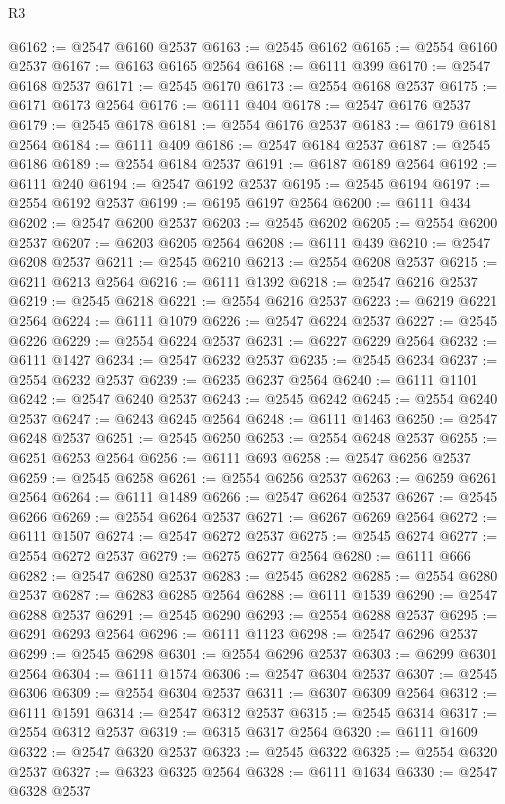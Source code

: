 \begin{lexlean}{R3}
\begin{coremodule}
@6162 := @2547 @6160 @2537
@6163 := @2545 @6162
@6165 := @2554 @6160 @2537
@6167 := @6163 @6165 @2564
@6168 := @6111 @399
@6170 := @2547 @6168 @2537
@6171 := @2545 @6170
@6173 := @2554 @6168 @2537
@6175 := @6171 @6173 @2564
@6176 := @6111 @404
@6178 := @2547 @6176 @2537
@6179 := @2545 @6178
@6181 := @2554 @6176 @2537
@6183 := @6179 @6181 @2564
@6184 := @6111 @409
@6186 := @2547 @6184 @2537
@6187 := @2545 @6186
@6189 := @2554 @6184 @2537
@6191 := @6187 @6189 @2564
@6192 := @6111 @240
@6194 := @2547 @6192 @2537
@6195 := @2545 @6194
@6197 := @2554 @6192 @2537
@6199 := @6195 @6197 @2564
@6200 := @6111 @434
@6202 := @2547 @6200 @2537
@6203 := @2545 @6202
@6205 := @2554 @6200 @2537
@6207 := @6203 @6205 @2564
@6208 := @6111 @439
@6210 := @2547 @6208 @2537
@6211 := @2545 @6210
@6213 := @2554 @6208 @2537
@6215 := @6211 @6213 @2564
@6216 := @6111 @1392
@6218 := @2547 @6216 @2537
@6219 := @2545 @6218
@6221 := @2554 @6216 @2537
@6223 := @6219 @6221 @2564
@6224 := @6111 @1079
@6226 := @2547 @6224 @2537
@6227 := @2545 @6226
@6229 := @2554 @6224 @2537
@6231 := @6227 @6229 @2564
@6232 := @6111 @1427
@6234 := @2547 @6232 @2537
@6235 := @2545 @6234
@6237 := @2554 @6232 @2537
@6239 := @6235 @6237 @2564
@6240 := @6111 @1101
@6242 := @2547 @6240 @2537
@6243 := @2545 @6242
@6245 := @2554 @6240 @2537
@6247 := @6243 @6245 @2564
@6248 := @6111 @1463
@6250 := @2547 @6248 @2537
@6251 := @2545 @6250
@6253 := @2554 @6248 @2537
@6255 := @6251 @6253 @2564
@6256 := @6111 @693
@6258 := @2547 @6256 @2537
@6259 := @2545 @6258
@6261 := @2554 @6256 @2537
@6263 := @6259 @6261 @2564
@6264 := @6111 @1489
@6266 := @2547 @6264 @2537
@6267 := @2545 @6266
@6269 := @2554 @6264 @2537
@6271 := @6267 @6269 @2564
@6272 := @6111 @1507
@6274 := @2547 @6272 @2537
@6275 := @2545 @6274
@6277 := @2554 @6272 @2537
@6279 := @6275 @6277 @2564
@6280 := @6111 @666
@6282 := @2547 @6280 @2537
@6283 := @2545 @6282
@6285 := @2554 @6280 @2537
@6287 := @6283 @6285 @2564
@6288 := @6111 @1539
@6290 := @2547 @6288 @2537
@6291 := @2545 @6290
@6293 := @2554 @6288 @2537
@6295 := @6291 @6293 @2564
@6296 := @6111 @1123
@6298 := @2547 @6296 @2537
@6299 := @2545 @6298
@6301 := @2554 @6296 @2537
@6303 := @6299 @6301 @2564
@6304 := @6111 @1574
@6306 := @2547 @6304 @2537
@6307 := @2545 @6306
@6309 := @2554 @6304 @2537
@6311 := @6307 @6309 @2564
@6312 := @6111 @1591
@6314 := @2547 @6312 @2537
@6315 := @2545 @6314
@6317 := @2554 @6312 @2537
@6319 := @6315 @6317 @2564
@6320 := @6111 @1609
@6322 := @2547 @6320 @2537
@6323 := @2545 @6322
@6325 := @2554 @6320 @2537
@6327 := @6323 @6325 @2564
@6328 := @6111 @1634
@6330 := @2547 @6328 @2537

\end{coremodule}
\end{lexlean}
